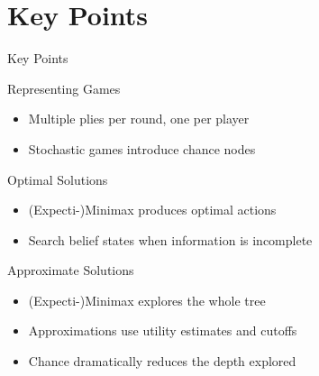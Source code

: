 \documentclass[14pt]{beamer}
\begin{document}
\part{Key Points}
\begin{frame}{Key Points}
	\begin{block}{Representing Games}
		\begin{itemize}
			\item Multiple plies per round, one per player
			\item Stochastic games introduce chance nodes
		\end{itemize}
	\end{block}
	\begin{block}{Optimal Solutions}
		\begin{itemize}
			\item (Expecti-)Minimax produces optimal actions
			\item Search belief states when information is incomplete
		\end{itemize}
	\end{block}
	\begin{block}{Approximate Solutions}
		\begin{itemize}
			\item (Expecti-)Minimax explores the whole tree
			\item Approximations use utility estimates and cutoffs
			\item Chance dramatically reduces the depth explored
		\end{itemize}
	\end{block}
\end{frame}
\end{document}
